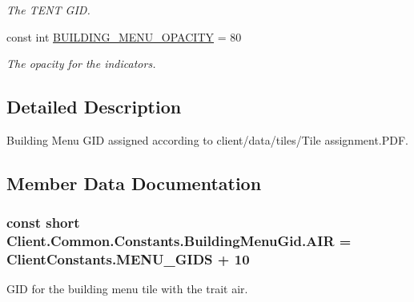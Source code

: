 \begin{DoxyCompactItemize}
\begin{DoxyCompactList}\small\item\em The T\+E\+N\+T G\+I\+D. \end{DoxyCompactList}\item 
const int \hyperlink{classClient_1_1Common_1_1Constants_1_1BuildingMenuGid_acc4d13f0a3eb52b0c80d1e1c912f94df}{B\+U\+I\+L\+D\+I\+N\+G\+\_\+\+M\+E\+N\+U\+\_\+\+O\+P\+A\+C\+I\+T\+Y} = 80
\begin{DoxyCompactList}\small\item\em The opacity for the indicators. \end{DoxyCompactList}\end{DoxyCompactItemize}


\subsection{Detailed Description}
Building Menu G\+I\+D assigned according to \textquotesingle{}client/data/tiles/\+Tile assignment.\+P\+D\+F\textquotesingle{}. 



\subsection{Member Data Documentation}
\hypertarget{classClient_1_1Common_1_1Constants_1_1BuildingMenuGid_a858bb44aca4bad0b0f8873a0e66af7d7}{}
\subsubsection[{A\+I\+R}]{\setlength{\rightskip}{0pt plus 5cm}const short Client.\+Common.\+Constants.\+Building\+Menu\+Gid.\+A\+I\+R = {\bf Client\+Constants.\+M\+E\+N\+U\+\_\+\+G\+I\+D\+S} + 10}\label{classClient_1_1Common_1_1Constants_1_1BuildingMenuGid_a858bb44aca4bad0b0f8873a0e66af7d7}


G\+I\+D for the building menu tile with the trait air. 

\hypertarget{classClient_1_1Common_1_1Constants_1_1BuildingMenuGid_aacfe4eb9f64ded35b0a24a25fa741be4}{}
